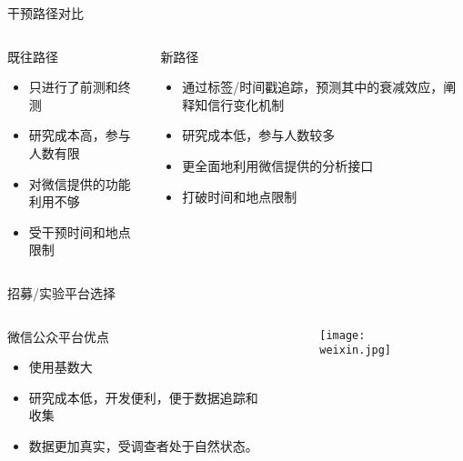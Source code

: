 \begin{frame}{干预路径对比}
\begin{columns}
    \begin{column}{0.5\textwidth}
        \begin{block}{既往路径}
            \begin{itemize}
                \item 只进行了前测和终测
                \item 研究成本高，参与人数有限
                \item 对微信提供的功能利用不够
                \item 受干预时间和地点限制
            \end{itemize}
        \end{block}
    \end{column}
    \begin{column}{0.5\textwidth}
       \begin{block}{新路径}
          \begin{itemize}
              \item 通过标签/时间戳追踪，预测其中的衰减效应，阐释知信行变化机制
              \item 研究成本低，参与人数较多
              \item 更全面地利用微信提供的分析接口
              \item 打破时间和地点限制
          \end{itemize}
      \end{block}
    \end{column}
\end{columns}
\end{frame}

\begin{frame}{招募/实验平台选择}
\begin{columns}
    \begin{column}{0.5\textwidth}
\begin{block}{微信公众平台优点}
\begin{itemize}
    \item 使用基数大
    \item 研究成本低，开发便利，便于数据追踪和收集
    \item 数据更加真实，受调查者处于自然状态。
\end{itemize}
\end{block}
    \end{column}
\begin{column}{0.5\textwidth}
\begin{figure}[h]
    \texttt{[image: weixin.jpg]}
\end{figure}
\end{column}
\end{columns}
\end{frame}

